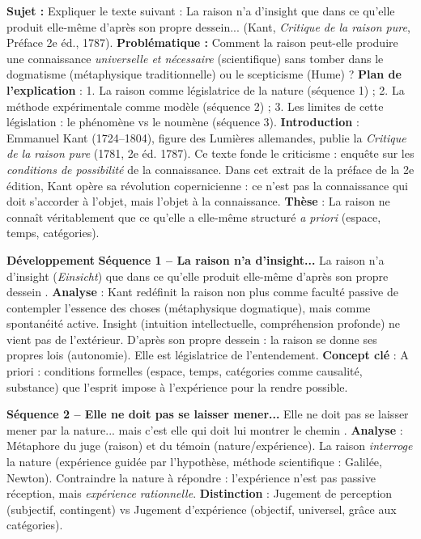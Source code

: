 \documentclass[11pt]{article}
\newcommand{\cle}[1]{{\popxbold\color{popdark}#1}}
\begin{document}
\begin{exoresolu}
    \textbf{Sujet :} Expliquer le texte suivant : \guillemotleft La raison n'a d'insight que dans ce qu'elle produit elle-même d'après son propre dessein... \guillemotright (Kant, \emph{Critique de la raison pure}, Préface 2e éd., 1787).
    \textbf{Problématique :} Comment la raison peut-elle produire une connaissance \emph{universelle et nécessaire} (scientifique) sans tomber dans le dogmatisme (métaphysique traditionnelle) ou le scepticisme (Hume) ?
    \textbf{Plan de l'explication} : 1. La raison comme législatrice de la nature (séquence 1) ; 2. La méthode expérimentale comme modèle (séquence 2) ; 3. Les limites de cette législation : le phénomène vs le noumène (séquence 3).
    \tcblower
    \textbf{Introduction} : Emmanuel Kant (1724--1804), figure des \cle{Lumières} allemandes, publie la \emph{Critique de la raison pure} (1781, 2e éd. 1787). Ce texte fonde le \cle{criticisme} : enquête sur les \emph{conditions de possibilité} de la connaissance. Dans cet extrait de la préface de la 2e édition, Kant opère sa \cle{révolution copernicienne} : ce n'est pas la connaissance qui doit s'accorder à l'objet, mais l'objet à la connaissance. \textbf{Thèse} : La raison ne connaît véritablement que ce qu'elle a elle-même structuré \emph{a priori} (espace, temps, catégories).

    \textbf{Développement}
    \textbf{Séquence 1 -- \guillemotleft La raison n'a d'insight... \guillemotright}
    \guillemotleft La raison n'a d'insight (\emph{Einsicht}) que dans ce qu'elle produit elle-même d'après son propre dessein \guillemotright.
    \textbf{Analyse} : Kant redéfinit la \cle{raison} non plus comme faculté passive de contempler l'essence des choses (métaphysique dogmatique), mais comme \cle{spontanéité} active. \guillemotleft Insight \guillemotright (intuition intellectuelle, compréhension profonde) ne vient pas de l'extérieur. \guillemotleft D'après son propre dessein \guillemotright : la raison se donne ses propres lois (\cle{autonomie}). Elle est \cle{législatrice} de l'entendement.
    \textbf{Concept clé} : \cle{A priori} : conditions formelles (espace, temps, catégories comme causalité, substance) que l'esprit impose à l'expérience pour la rendre possible.

    \textbf{Séquence 2 -- \guillemotleft Elle ne doit pas se laisser mener... \guillemotright}
    \guillemotleft Elle ne doit pas se laisser mener par la nature... mais c'est elle qui doit lui montrer le chemin \guillemotright.
    \textbf{Analyse} : Métaphore du \cle{juge} (raison) et du \cle{témoin} (nature/expérience). La raison \emph{interroge} la nature (expérience guidée par l'hypothèse, \cle{méthode scientifique} : Galilée, Newton). \guillemotleft Contraindre la nature à répondre \guillemotright : l'expérience n'est pas passive réception, mais \emph{expérience rationnelle}.
    \textbf{Distinction} : \cle{Jugement de perception} (subjectif, contingent) vs \cle{Jugement d'expérience} (objectif, universel, grâce aux catégories).


\end{exoresolu}
\end{document}
